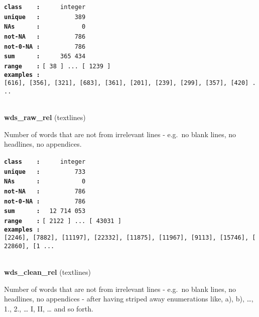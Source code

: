 \documentclass[]{article}
\begin{document}
\textbf{\texttt{class\ \ \ \ :}} \texttt{~~~~~integer}\\
\textbf{\texttt{unique\ \ \ :}} \texttt{~~~~~~~~~389}\\
\textbf{\texttt{NAs\ \ \ \ \ \ :}} \texttt{~~~~~~~~~~~0}\\
\textbf{\texttt{not-NA\ \ \ :}} \texttt{~~~~~~~~~786}\\
\textbf{\texttt{not-0-NA\ :}} \texttt{~~~~~~~~~786}\\
\textbf{\texttt{sum\ \ \ \ \ \ :}} \texttt{~~~~~365~434}\\
\textbf{\texttt{range\ \ \ \ :}}
\texttt{{[}\ 38\ {]}\ ...\ {[}\ 1239\ {]}}\\
\textbf{\texttt{examples\ :}}
\texttt{{[}616{]},\ {[}356{]},\ {[}321{]},\ {[}683{]},\ {[}361{]},\ {[}201{]},\ {[}239{]},\ {[}299{]},\ {[}357{]},\ {[}420{]}\ ...}\\

~

\textbf{wds\_raw\_rel} (textlines)

Number of words that are not from irrelevant lines - e.g.~no blank
lines, no headlines, no appendices.

\textbf{\texttt{class\ \ \ \ :}} \texttt{~~~~~integer}\\
\textbf{\texttt{unique\ \ \ :}} \texttt{~~~~~~~~~733}\\
\textbf{\texttt{NAs\ \ \ \ \ \ :}} \texttt{~~~~~~~~~~~0}\\
\textbf{\texttt{not-NA\ \ \ :}} \texttt{~~~~~~~~~786}\\
\textbf{\texttt{not-0-NA\ :}} \texttt{~~~~~~~~~786}\\
\textbf{\texttt{sum\ \ \ \ \ \ :}} \texttt{~~12~714~053}\\
\textbf{\texttt{range\ \ \ \ :}}
\texttt{{[}\ 2122\ {]}\ ...\ {[}\ 43031\ {]}}\\
\textbf{\texttt{examples\ :}}
\texttt{{[}2246{]},\ {[}7882{]},\ {[}11197{]},\ {[}22332{]},\ {[}11875{]},\ {[}11967{]},\ {[}9113{]},\ {[}15746{]},\ {[}22860{]},\ {[}1\ ...}\\

~

\textbf{wds\_clean\_rel} (textlines)

Number of words that are not from irrelevant lines - e.g.~no blank
lines, no headlines, no appendices - after having striped away
enumerations like, a), b), \ldots{}, 1., 2., \ldots{} I, II, \ldots{}
and so forth.
\end{document}

